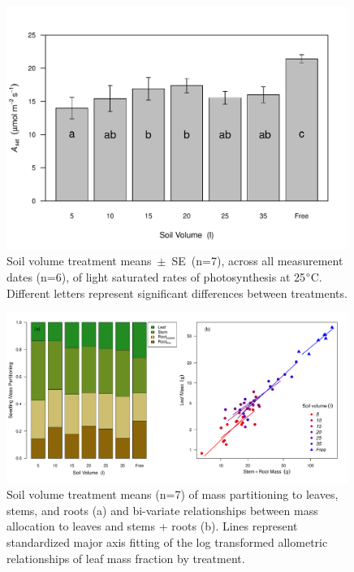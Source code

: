 \documentclass[a4paper]{article}\usepackage[]{graphicx}\usepackage[]{color}
\begin{document}
\begin{figure}[h!]
    \centering
    \includegraphics[width=0.99\textwidth]{Asat.pdf}
    \caption{Soil volume treatment means~$\pm$~SE~(n=7), across all measurement dates (n=6), of light saturated rates of photosynthesis at 25$\degree$C. Different letters represent significant differences between treatments.}
    \label{fig:figure3}
\end{figure}

\begin{figure}[h!]
    \centering
    \includegraphics[width=0.99\textwidth]{massfractions.pdf}
    \caption{Soil volume treatment means (n=7) of mass partitioning to leaves, stems, and roots (a) and bi-variate relationships between mass allocation to leaves and stems + roots (b). Lines represent standardized major axis fitting of the log transformed allometric relationships of leaf mass fraction by treatment.}
    \label{fig:figure4}
\end{figure}
\end{document}
